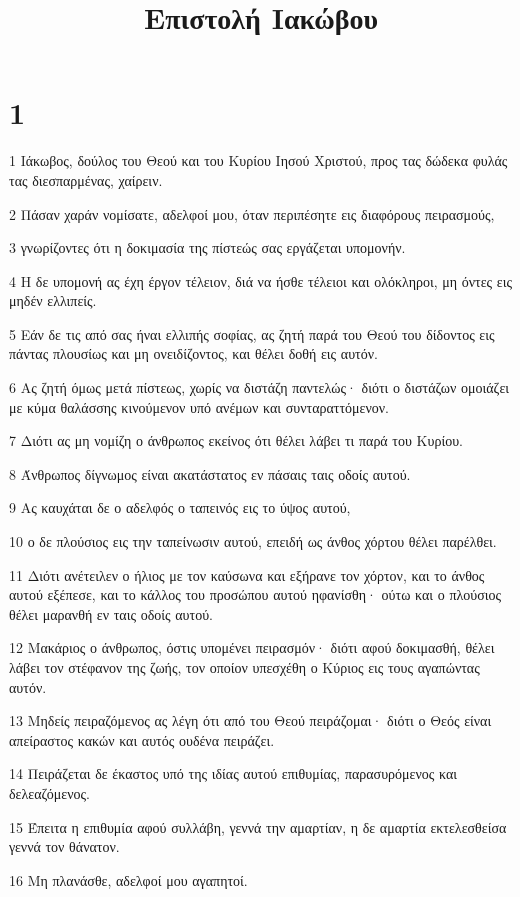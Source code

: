 

\title{Επιστολή Ιακώβου}


\chapter{1}

\par 1 Ιάκωβος, δούλος του Θεού και του Κυρίου Ιησού Χριστού, προς τας δώδεκα φυλάς τας διεσπαρμένας, χαίρειν.
\par 2 Πάσαν χαράν νομίσατε, αδελφοί μου, όταν περιπέσητε εις διαφόρους πειρασμούς,
\par 3 γνωρίζοντες ότι η δοκιμασία της πίστεώς σας εργάζεται υπομονήν.
\par 4 Η δε υπομονή ας έχη έργον τέλειον, διά να ήσθε τέλειοι και ολόκληροι, μη όντες εις μηδέν ελλιπείς.
\par 5 Εάν δε τις από σας ήναι ελλιπής σοφίας, ας ζητή παρά του Θεού του δίδοντος εις πάντας πλουσίως και μη ονειδίζοντος, και θέλει δοθή εις αυτόν.
\par 6 Ας ζητή όμως μετά πίστεως, χωρίς να διστάζη παντελώς· διότι ο διστάζων ομοιάζει με κύμα θαλάσσης κινούμενον υπό ανέμων και συνταραττόμενον.
\par 7 Διότι ας μη νομίζη ο άνθρωπος εκείνος ότι θέλει λάβει τι παρά του Κυρίου.
\par 8 Άνθρωπος δίγνωμος είναι ακατάστατος εν πάσαις ταις οδοίς αυτού.
\par 9 Ας καυχάται δε ο αδελφός ο ταπεινός εις το ύψος αυτού,
\par 10 ο δε πλούσιος εις την ταπείνωσιν αυτού, επειδή ως άνθος χόρτου θέλει παρέλθει.
\par 11 Διότι ανέτειλεν ο ήλιος με τον καύσωνα και εξήρανε τον χόρτον, και το άνθος αυτού εξέπεσε, και το κάλλος του προσώπου αυτού ηφανίσθη· ούτω και ο πλούσιος θέλει μαρανθή εν ταις οδοίς αυτού.
\par 12 Μακάριος ο άνθρωπος, όστις υπομένει πειρασμόν· διότι αφού δοκιμασθή, θέλει λάβει τον στέφανον της ζωής, τον οποίον υπεσχέθη ο Κύριος εις τους αγαπώντας αυτόν.
\par 13 Μηδείς πειραζόμενος ας λέγη ότι από του Θεού πειράζομαι· διότι ο Θεός είναι απείραστος κακών και αυτός ουδένα πειράζει.
\par 14 Πειράζεται δε έκαστος υπό της ιδίας αυτού επιθυμίας, παρασυρόμενος και δελεαζόμενος.
\par 15 Έπειτα η επιθυμία αφού συλλάβη, γεννά την αμαρτίαν, η δε αμαρτία εκτελεσθείσα γεννά τον θάνατον.
\par 16 Μη πλανάσθε, αδελφοί μου αγαπητοί.
